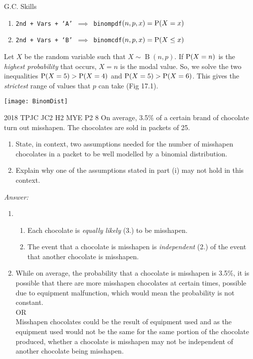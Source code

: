 \documentclass[oneside]{book}
\begin{document}
\begin{lbox}[colbacktitle=white, coltitle=black, colframe=black]{G.C. Skills} 
  \begin{enumerate}
    \item \texttt{2nd + Vars + `A' \(\implies\) binompdf\((n,p,x)=\operatorname{P}(X=x)\)}
    \item \texttt{2nd + Vars + `B' \(\implies\) binomcdf\((n,p,x)=\operatorname{P}(X\leq x)\)}
  \end{enumerate}
\end{lbox}
\begin{note}
  Let \(X\) be the random variable such that \(X \sim \operatorname{B}(n,p)\). If \(\operatorname{P}(X=n)\) is the \emph{highest probability} that occurs, \(X=n\) is the modal value. So, we solve the two inequalities \(\operatorname{P}(X=5)>\operatorname{P}(X=4)\) and \(\operatorname{P}(X=5)>\operatorname{P}(X=6)\). This gives the \emph{strictest} range of values that \(p\) can take (Fig 17.1).
\end{note}
\begin{center}
  \texttt{[image: BinomDist]}
\end{center}
\begin{example}{2018 TPJC JC2 H2 MYE P2 8}{}
  On average, 3.5\% of a certain brand of chocolate turn out misshapen. The chocolates are sold in packets of 25.
  \begin{enumerate}[label=(\roman*)]
    \item State, in context, two assumptions needed for the number of misshapen chocolates in a packet to be well modelled by a binomial distribution.
    \item Explain why one of the assumptions stated in part (i) may not hold in this context.
  \end{enumerate}
  \textit{Answer:}
  \begin{enumerate}[label=(\roman*)]
    \item 
    \begin{enumerate}[label=\arabic*.]
      \item Each chocolate is \emph{equally likely} (3.) to be misshapen.
      \item The event that a chocolate is misshapen is \emph{independent} (2.) of the event that another chocolate is misshapen.
    \end{enumerate}
    \item While on average, the probability that a chocolate is misshapen is 3.5\%, it is possible that there are more misshapen chocolates at certain times, possible due to equipment malfunction, which would mean the probability is not constant.\\[3mm]
    OR\\[3mm]
    Misshapen chocolates could be the result of equipment used and as the equipment used would not be the same for the same portion of the chocolate produced, whether a chocolate is misshapen may not be independent of another chocolate being misshapen.
  \end{enumerate}
\end{example}
\end{document}
